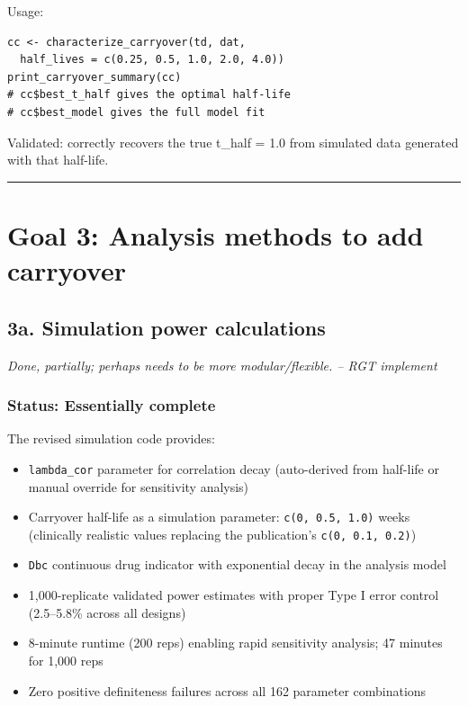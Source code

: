 \documentclass[11pt]{article}
\begin{document}
Usage:
\begin{lstlisting}
cc <- characterize_carryover(td, dat,
  half_lives = c(0.25, 0.5, 1.0, 2.0, 4.0))
print_carryover_summary(cc)
# cc$best_t_half gives the optimal half-life
# cc$best_model gives the full model fit
\end{lstlisting}

Validated: correctly recovers the true t\_half = 1.0 from
simulated data generated with that half-life.

\bigskip\noindent\rule{\textwidth}{0.4pt}\bigskip

\section{Goal 3: Analysis methods to add carryover}

\subsection{3a. Simulation power calculations}

\textit{Done, partially; perhaps needs to be more modular/flexible.
-- RGT implement}

\subsubsection{Status: Essentially complete}

The revised simulation code provides:

\begin{itemize}
  \item \texttt{lambda\_cor} parameter for correlation decay
    (auto-derived from half-life or manual override for
    sensitivity analysis)
  \item Carryover half-life as a simulation parameter:
    \texttt{c(0, 0.5, 1.0)} weeks (clinically realistic values
    replacing the publication's \texttt{c(0, 0.1, 0.2)})
  \item \texttt{Dbc} continuous drug indicator with exponential decay
    in the analysis model
  \item 1,000-replicate validated power estimates with proper
    Type I error control (2.5--5.8\% across all designs)
  \item 8-minute runtime (200 reps) enabling rapid sensitivity
    analysis; 47 minutes for 1,000 reps
  \item Zero positive definiteness failures across all 162
    parameter combinations
\end{itemize}
\end{document}
